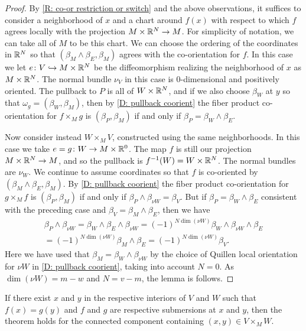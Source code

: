 \begin{proof}
	By \cref{R: co-or restriction or switch} and the above observations, it suffices to consider a neighborhood of $x$ and a chart around $f(x)$ with respect to which $f$ agrees locally with the projection $M \times \mathbb{R}^N \to M$.
	For simplicity of notation, we can take all of $M$ to be this chart.
	We can choose the ordering of the coordinates in $\mathbb{R}^N$ so that $(\beta_M \wedge \beta_E,\beta_M)$ agrees with the co-orientation for $f$.
	In this case we let $e \colon V \hookrightarrow M \times \mathbb{R}^N$ be the diffeomorphism realizing the neighborhood of $x$ as $M \times \mathbb{R}^N$.
	The normal bundle $\nu_V$ in this case is $0$-dimensional and positively oriented.
	The pullback to $P$ is all of $W \times \mathbb{R}^N$, and if we also choose $\beta_W$ at $y$ so that $\omega_g = (\beta_W,\beta_M)$, then by \cref{D: pullback coorient} the fiber product co-orientation for $f \times_M g$ is $(\beta_P,\beta_M)$ if and only if $\beta_P = \beta_W \wedge \beta_E$.

	Now consider instead $W \times_M V$, constructed using the same neighborhoods.
	In this case we take $e = g \colon W \to M \times \mathbb{R}^0$.
	The map $f$ is still our projection $M \times \mathbb{R}^N \to M$, and so the pullback is $f^{-1}(W) = W \times \mathbb{R}^N$.
	The normal bundles are $\nu_W$.
	We continue to assume coordinates so that $f$ is co-oriented by $(\beta_M \wedge \beta_E, \beta_M)$.
	By \cref{D: pullback coorient} the fiber product co-orientation for $g \times_M f$ is $(\beta_P,\beta_M)$ if and only if $\beta_P \wedge \beta_{\nu W} = \beta_V$.
	But if $\beta_P = \beta_W \wedge \beta_E$ consistent with the preceding case and $\beta_V = \beta_M \wedge \beta_E$, then we have
	\begin{multline*}
		\beta_P \wedge \beta_{\nu W} =
		\beta_W \wedge \beta_E \wedge \beta_{\nu W} =
		(-1)^{N\dim(\nu W)} \beta_W \wedge \beta_{\nu W} \wedge \beta_E \\ =
		(-1)^{N\dim(\nu W)} \beta_M \wedge \beta_E =
		(-1)^{N\dim(\nu W)} \beta_V.
	\end{multline*}
	Here we have used that $\beta_M = \beta_W \wedge \beta_{\nu W}$ by the choice of Quillen local orientation for $\nu W$ in \cref{D: pullback coorient}, taking into account $N = 0$.
	As $\dim(\nu W) = m-w$ and $N = v-m$, the lemma is follows.
\end{proof}

\begin{lemma}\label{L: sub/sub}
	If there exist $x$ and $y$ in the respective interiors of $V$ and $W$ such that $f(x) = g(y)$ and $f$ and $g$ are respective submersions at $x$ and $y$, then the theorem holds for the connected component containing $(x,y) \in V \times_M W$.
\end{lemma}

